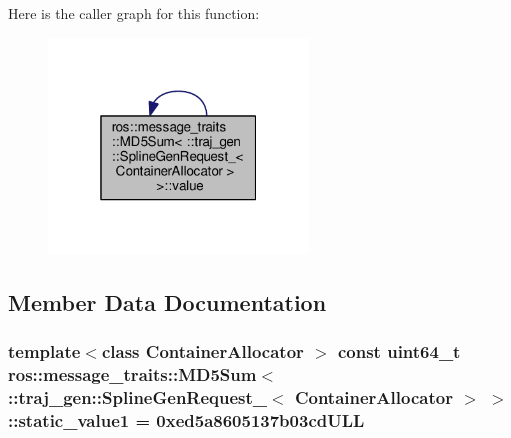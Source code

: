 Here is the caller graph for this function\+:
\nopagebreak
\begin{figure}[H]
\begin{center}
\leavevmode
\includegraphics[width=196pt]{structros_1_1message__traits_1_1_m_d5_sum_3_01_1_1traj__gen_1_1_spline_gen_request___3_01_container_allocator_01_4_01_4_a420d69aa16318f033664cb6cb39e6425_icgraph}
\end{center}
\end{figure}




\subsection{Member Data Documentation}
\subsubsection[{\texorpdfstring{static\+\_\+value1}{static_value1}}]{\setlength{\rightskip}{0pt plus 5cm}template$<$class Container\+Allocator $>$ const uint64\+\_\+t ros\+::message\+\_\+traits\+::\+M\+D5\+Sum$<$ \+::{\bf traj\+\_\+gen\+::\+Spline\+Gen\+Request\+\_\+}$<$ Container\+Allocator $>$ $>$\+::static\+\_\+value1 = 0xed5a8605137b03cd\+U\+LL\hspace{0.3cm}{\ttfamily [static]}}\hypertarget{structros_1_1message__traits_1_1_m_d5_sum_3_01_1_1traj__gen_1_1_spline_gen_request___3_01_container_allocator_01_4_01_4_aa66200588fae4be5b5d4409ee501d238}{}\label{structros_1_1message__traits_1_1_m_d5_sum_3_01_1_1traj__gen_1_1_spline_gen_request___3_01_container_allocator_01_4_01_4_aa66200588fae4be5b5d4409ee501d238}


